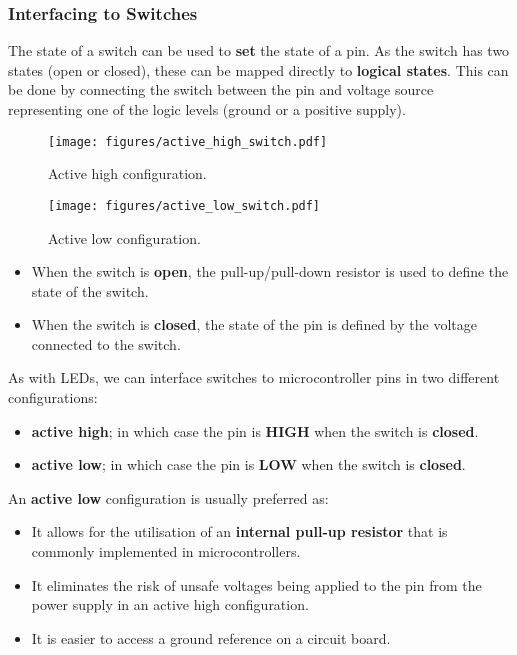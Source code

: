 \documentclass{article}
\begin{document}
\subsubsection{Interfacing to Switches}
The state of a switch can be used to \textbf{set} the state of a pin.
As the switch has two states (open or closed), these can be mapped
directly to \textbf{logical states}. This can be done by connecting the
switch between the pin and voltage source representing one of the logic
levels (ground or a positive supply).
\begin{multicols}{2}
    \begin{figure}[H]
        \centering
        \texttt{[image: figures/active\_high\_switch.pdf]}
        \caption{Active high configuration.} %
    \end{figure}
    \begin{figure}[H]
        \centering
        \texttt{[image: figures/active\_low\_switch.pdf]}
        \caption{Active low configuration.} %
    \end{figure}
\end{multicols}
\begin{itemize}
    \item When the switch is \textbf{open}, the pull-up/pull-down
          resistor is used to define the state of the switch.
    \item When the switch is \textbf{closed}, the state of the pin is
          defined by the voltage connected to the switch.
\end{itemize}
As with LEDs, we can interface switches to microcontroller pins in two
different configurations:
\begin{itemize}
    \item \textbf{active high}; in which case the pin is \textbf{HIGH} when the switch is \textbf{closed}.
    \item \textbf{active low}; in which case the pin is \textbf{LOW} when the switch is \textbf{closed}.
\end{itemize}
An \textbf{active low} configuration is usually preferred as:
\begin{itemize}
    \item It allows for the utilisation of an \textbf{internal pull-up
          resistor} that is commonly implemented in microcontrollers.
    \item It eliminates the risk of unsafe voltages being applied to
          the pin from the power supply in an active high
          configuration.
    \item It is easier to access a ground reference on a circuit board.
\end{itemize}
\end{document}
